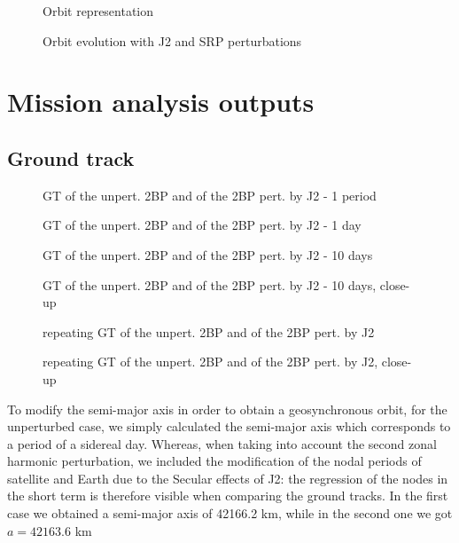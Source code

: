 \documentclass[11pt,a4paper]{report}
\begin{document}
\begin{figure}[H]
\centering
{}
\caption{Orbit representation}
\end{figure}

\begin{figure}[H]
\centering
{}
\caption{Orbit evolution with J2 and SRP perturbations}
\end{figure}

\section{Mission analysis outputs}

\subsection{Ground track}

\begin{figure}[H]
\centering
{}
\caption{GT of the unpert. 2BP and of the 2BP pert. by J2 - 1 period}
\end{figure}
\begin{figure}[H]
\centering
{}
\caption{GT of the unpert. 2BP and of the 2BP pert. by J2 - 1 day}
\end{figure}
\begin{figure}[H]
\centering
{}
\caption{GT of the unpert. 2BP and of the 2BP pert. by J2 - 10 days}
\end{figure}
\begin{figure}[H]
\centering
{}
\caption{GT of the unpert. 2BP and of the 2BP pert. by J2 - 10 days, close-up}
\end{figure}
\begin{figure}[H]
\centering
{}
\caption{repeating GT of the unpert. 2BP and of the 2BP pert. by J2}
\end{figure}
\begin{figure}[H]
\centering
{}
\caption{repeating GT of the unpert. 2BP and of the 2BP pert. by J2, close-up}
\end{figure}

To modify the semi-major axis in order to obtain a geosynchronous orbit, for the unperturbed case, we simply calculated the semi-major axis which corresponds to a period of a sidereal day. Whereas, when taking into account the second zonal harmonic perturbation, we included the modification of the nodal periods of satellite and Earth due to the Secular effects of J2: the regression of the nodes in the short term is therefore visible when comparing the ground tracks.
In the first case we obtained a semi-major axis of 42166.2 km, while in the second one we got $a = 42163.6$ km
\end{document}
